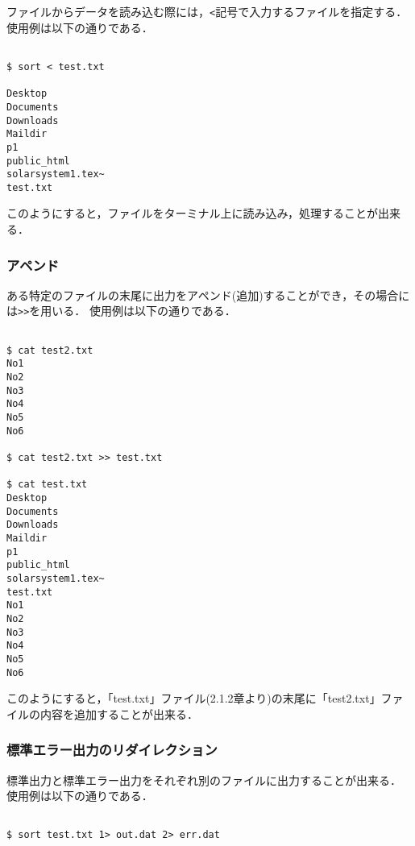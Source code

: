 \documentclass[a4j,11pt]{jarticle}
\begin{document}
ファイルからデータを読み込む際には，\verb|<|記号で入力するファイルを指定する．
使用例は以下の通りである．

\begin{verbatim}

$ sort < test.txt

Desktop
Documents
Downloads
Maildir
p1
public_html
solarsystem1.tex~
test.txt

\end{verbatim}

このようにすると，ファイルをターミナル上に読み込み，処理することが出来る．


\subsubsection{アペンド}

ある特定のファイルの末尾に出力をアペンド(追加)することができ，その場合には\verb|>>|を用いる．
使用例は以下の通りである．

\begin{verbatim}

$ cat test2.txt 
No1
No2
No3
No4
No5
No6

$ cat test2.txt >> test.txt 

$ cat test.txt 
Desktop
Documents
Downloads
Maildir
p1
public_html
solarsystem1.tex~
test.txt
No1
No2
No3
No4
No5
No6

\end{verbatim}

このようにすると，「test.txt」ファイル(2.1.2章より)の末尾に「test2.txt」ファイルの内容を追加することが出来る．


\subsubsection{標準エラー出力のリダイレクション}

標準出力と標準エラー出力をそれぞれ別のファイルに出力することが出来る．\\
使用例は以下の通りである．

\begin{verbatim}

$ sort test.txt 1> out.dat 2> err.dat

\end{verbatim}
\end{document}
